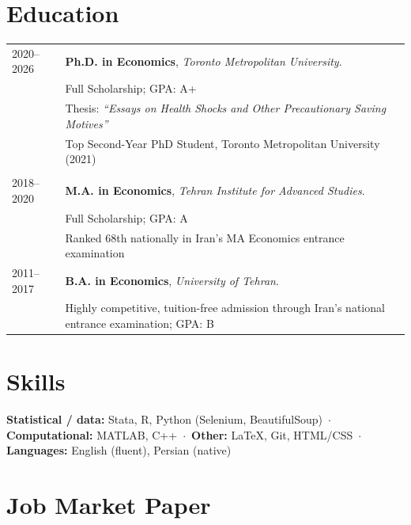 \documentclass[11pt]{article}
\begin{document}
\section{Education}

\begin{tabular}{@{}p{1.25in} p{5in}@{}}
  2020--2026 & \textbf{Ph.D. in Economics}, \textit{Toronto Metropolitan University}. \\
  & {\footnotesize Full Scholarship; GPA: A+} \\
  & {\footnotesize Thesis: \textit{``Essays on Health Shocks and Other Precautionary Saving Motives''}} \\
  & {\footnotesize Top Second-Year PhD Student, Toronto Metropolitan University (2021)} \\
  \\[6pt]

  2018--2020 & \textbf{M.A. in Economics}, \textit{Tehran Institute for Advanced Studies}. \\
  & {\footnotesize Full Scholarship; GPA: A} \\
  & {\footnotesize Ranked 68th nationally in Iran's MA Economics entrance examination} \\[6pt]

  2011--2017 & \textbf{B.A. in Economics}, \textit{University of Tehran}. \\
  & {\footnotesize Highly competitive, tuition-free admission through Iran's national entrance examination; GPA: B} \\
\end{tabular}

\vspace{-4pt}
\section{Skills}

{\footnotesize\noindent\textbf{Statistical / data:} Stata, R, Python (Selenium, BeautifulSoup) \,$\cdot$\,
\textbf{Computational:} MATLAB, C++ \,$\cdot$\,
\textbf{Other:} \LaTeX{}, Git, HTML/CSS \,$\cdot$\,
\textbf{Languages:} English (fluent), Persian (native)}

\pagebreak
\small

\section{Job Market Paper}
\end{document}

